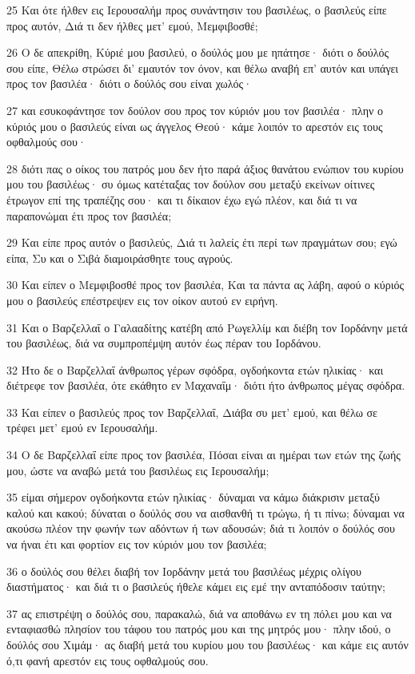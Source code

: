 \par 25 Και ότε ήλθεν εις Ιερουσαλήμ προς συνάντησιν του βασιλέως, ο βασιλεύς είπε προς αυτόν, Διά τι δεν ήλθες μετ' εμού, Μεμφιβοσθέ;
\par 26 Ο δε απεκρίθη, Κύριέ μου βασιλεύ, ο δούλός μου με ηπάτησε· διότι ο δούλός σου είπε, Θέλω στρώσει δι' εμαυτόν τον όνον, και θέλω αναβή επ' αυτόν και υπάγει προς τον βασιλέα· διότι ο δούλός σου είναι χωλός·
\par 27 και εσυκοφάντησε τον δούλον σου προς τον κύριόν μου τον βασιλέα· πλην ο κύριός μου ο βασιλεύς είναι ως άγγελος Θεού· κάμε λοιπόν το αρεστόν εις τους οφθαλμούς σου·
\par 28 διότι πας ο οίκος του πατρός μου δεν ήτο παρά άξιος θανάτου ενώπιον του κυρίου μου του βασιλέως· συ όμως κατέταξας τον δούλον σου μεταξύ εκείνων οίτινες έτρωγον επί της τραπέζης σου· και τι δίκαιον έχω εγώ πλέον, και διά τι να παραπονώμαι έτι προς τον βασιλέα;
\par 29 Και είπε προς αυτόν ο βασιλεύς, Διά τι λαλείς έτι περί των πραγμάτων σου; εγώ είπα, Συ και ο Σιβά διαμοιράσθητε τους αγρούς.
\par 30 Και είπεν ο Μεμφιβοσθέ προς τον βασιλέα, Και τα πάντα ας λάβη, αφού ο κύριός μου ο βασιλεύς επέστρεψεν εις τον οίκον αυτού εν ειρήνη.
\par 31 Και ο Βαρζελλαΐ ο Γαλααδίτης κατέβη από Ρωγελλίμ και διέβη τον Ιορδάνην μετά του βασιλέως, διά να συμπροπέμψη αυτόν έως πέραν του Ιορδάνου.
\par 32 Ήτο δε ο Βαρζελλαΐ άνθρωπος γέρων σφόδρα, ογδοήκοντα ετών ηλικίας· και διέτρεφε τον βασιλέα, ότε εκάθητο εν Μαχαναΐμ· διότι ήτο άνθρωπος μέγας σφόδρα.
\par 33 Και είπεν ο βασιλεύς προς τον Βαρζελλαΐ, Διάβα συ μετ' εμού, και θέλω σε τρέφει μετ' εμού εν Ιερουσαλήμ.
\par 34 Ο δε Βαρζελλαΐ είπε προς τον βασιλέα, Πόσαι είναι αι ημέραι των ετών της ζωής μου, ώστε να αναβώ μετά του βασιλέως εις Ιερουσαλήμ;
\par 35 είμαι σήμερον ογδοήκοντα ετών ηλικίας· δύναμαι να κάμω διάκρισιν μεταξύ καλού και κακού; δύναται ο δούλός σου να αισθανθή τι τρώγω, ή τι πίνω; δύναμαι να ακούσω πλέον την φωνήν των αδόντων ή των αδουσών; διά τι λοιπόν ο δούλός σου να ήναι έτι και φορτίον εις τον κύριόν μου τον βασιλέα;
\par 36 ο δούλός σου θέλει διαβή τον Ιορδάνην μετά του βασιλέως μέχρις ολίγου διαστήματος· και διά τι ο βασιλεύς ήθελε κάμει εις εμέ την ανταπόδοσιν ταύτην;
\par 37 ας επιστρέψη ο δούλός σου, παρακαλώ, διά να αποθάνω εν τη πόλει μου και να ενταφιασθώ πλησίον του τάφου του πατρός μου και της μητρός μου· πλην ιδού, ο δούλός σου Χιμάμ· ας διαβή μετά του κυρίου μου του βασιλέως· και κάμε εις αυτόν ό,τι φανή αρεστόν εις τους οφθαλμούς σου.
